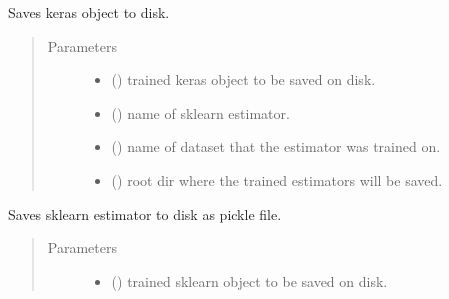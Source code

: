 \documentclass[letterpaper,10pt,english]{sphinxmanual}
\begin{document}
\begin{fulllineitems}
\begin{fulllineitems}
\label{\detokenize{shared:mleap.shared.files_io.DiskOperations.save_keras_model}}
Saves keras object to disk.
\begin{quote}\begin{description}
\item[{Parameters}] \leavevmode\begin{itemize}
\item {} 
 () \textendash{} trained keras object to be saved on disk.

\item {} 
 () \textendash{} name of sklearn estimator.

\item {} 
 () \textendash{} name of dataset that the estimator was trained on.

\item {} 
 () \textendash{} root dir where the trained estimators will be saved.

\end{itemize}

\end{description}\end{quote}

\end{fulllineitems}


\begin{fulllineitems}
\label{\detokenize{shared:mleap.shared.files_io.DiskOperations.save_to_pickle}}
Saves sklearn estimator to disk as pickle file.
\begin{quote}\begin{description}
\item[{Parameters}] \leavevmode\begin{itemize}
\item {} 
 () \textendash{} trained sklearn object to be saved on disk.


\end{itemize}
\end{description}
\end{quote}
\end{fulllineitems}
\end{fulllineitems}
\end{document}
